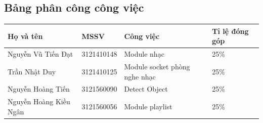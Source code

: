 \documentclass[a4paper]{article}
\begin{document}
\subsection{Bảng phân công công việc}
\begin{tabular}{llll}
\toprule
  Họ và tên & MSSV  & Công việc & Tỉ lệ đóng góp\\
  \midrule
   Nguyễn Vũ Tiến Đạt    & 3121410148  & Module nhạc & 25\% \\
 Trần Nhật Duy  &3121410125   & Module socket phòng nghe nhạc & 25\% \\
 Nguyễn Hoàng Tiến   & 3121560090 & Detect Object &  25\%\\
 Nguyễn Hoàng Kiều Ngân & 3121560056 & Module playlist & 25\% \\
   \bottomrule
\end{tabular}
\end{document}

